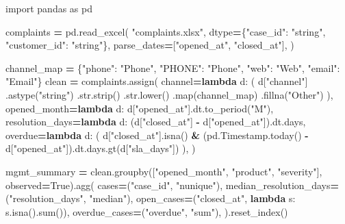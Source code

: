 \documentclass[
  12pt,
]{article}
\newenvironment{Shaded}{\begin{snugshade}}{\end{snugshade}}
\newcommand{\BuiltInTok}[1]{#1}
\newcommand{\ImportTok}[1]{#1}
\newcommand{\KeywordTok}[1]{\textcolor[rgb]{0.13,0.29,0.53}{\textbf{#1}}}
\newcommand{\NormalTok}[1]{#1}
\newcommand{\OperatorTok}[1]{\textcolor[rgb]{0.81,0.36,0.00}{\textbf{#1}}}
\newcommand{\StringTok}[1]{\textcolor[rgb]{0.31,0.60,0.02}{#1}}
\newcommand{\VariableTok}[1]{\textcolor[rgb]{0.00,0.00,0.00}{#1}}
\begin{document}
\begin{Shaded}
\begin{Highlighting}[]
\ImportTok{import}\NormalTok{ pandas }\ImportTok{as}\NormalTok{ pd}

\NormalTok{complaints }\OperatorTok{=}\NormalTok{ pd.read\_excel(}
    \StringTok{"complaints.xlsx"}\NormalTok{,}
\NormalTok{    dtype}\OperatorTok{=}\NormalTok{\{}\StringTok{"case\_id"}\NormalTok{: }\StringTok{"string"}\NormalTok{, }\StringTok{"customer\_id"}\NormalTok{: }\StringTok{"string"}\NormalTok{\},}
\NormalTok{    parse\_dates}\OperatorTok{=}\NormalTok{[}\StringTok{"opened\_at"}\NormalTok{, }\StringTok{"closed\_at"}\NormalTok{],}
\NormalTok{)}

\NormalTok{channel\_map }\OperatorTok{=}\NormalTok{ \{}\StringTok{"phone"}\NormalTok{: }\StringTok{"Phone"}\NormalTok{, }\StringTok{"PHONE"}\NormalTok{: }\StringTok{"Phone"}\NormalTok{, }\StringTok{"web"}\NormalTok{: }\StringTok{"Web"}\NormalTok{, }\StringTok{"email"}\NormalTok{: }\StringTok{"Email"}\NormalTok{\}}
\NormalTok{clean }\OperatorTok{=}\NormalTok{ complaints.assign(}
\NormalTok{    channel}\OperatorTok{=}\KeywordTok{lambda}\NormalTok{ d: (}
\NormalTok{        d[}\StringTok{"channel"}\NormalTok{]}
\NormalTok{        .astype(}\StringTok{"string"}\NormalTok{)}
\NormalTok{        .}\BuiltInTok{str}\NormalTok{.strip()}
\NormalTok{        .}\BuiltInTok{str}\NormalTok{.lower()}
\NormalTok{        .}\BuiltInTok{map}\NormalTok{(channel\_map)}
\NormalTok{        .fillna(}\StringTok{"Other"}\NormalTok{)}
\NormalTok{    ),}
\NormalTok{    opened\_month}\OperatorTok{=}\KeywordTok{lambda}\NormalTok{ d: d[}\StringTok{"opened\_at"}\NormalTok{].dt.to\_period(}\StringTok{"M"}\NormalTok{),}
\NormalTok{    resolution\_days}\OperatorTok{=}\KeywordTok{lambda}\NormalTok{ d: (d[}\StringTok{"closed\_at"}\NormalTok{] }\OperatorTok{{-}}\NormalTok{ d[}\StringTok{"opened\_at"}\NormalTok{]).dt.days,}
\NormalTok{    overdue}\OperatorTok{=}\KeywordTok{lambda}\NormalTok{ d: (}
\NormalTok{        d[}\StringTok{"closed\_at"}\NormalTok{].isna()}
        \OperatorTok{\&}\NormalTok{ (pd.Timestamp.today() }\OperatorTok{{-}}\NormalTok{ d[}\StringTok{"opened\_at"}\NormalTok{]).dt.days.gt(d[}\StringTok{"sla\_days"}\NormalTok{])}
\NormalTok{    ),}
\NormalTok{)}

\NormalTok{mgmt\_summary }\OperatorTok{=}\NormalTok{ clean.groupby([}\StringTok{"opened\_month"}\NormalTok{, }\StringTok{"product"}\NormalTok{, }\StringTok{"severity"}\NormalTok{], observed}\OperatorTok{=}\VariableTok{True}\NormalTok{).agg(}
\NormalTok{    cases}\OperatorTok{=}\NormalTok{(}\StringTok{"case\_id"}\NormalTok{, }\StringTok{"nunique"}\NormalTok{),}
\NormalTok{    median\_resolution\_days}\OperatorTok{=}\NormalTok{(}\StringTok{"resolution\_days"}\NormalTok{, }\StringTok{"median"}\NormalTok{),}
\NormalTok{    open\_cases}\OperatorTok{=}\NormalTok{(}\StringTok{"closed\_at"}\NormalTok{, }\KeywordTok{lambda}\NormalTok{ s: s.isna().}\BuiltInTok{sum}\NormalTok{()),}
\NormalTok{    overdue\_cases}\OperatorTok{=}\NormalTok{(}\StringTok{"overdue"}\NormalTok{, }\StringTok{"sum"}\NormalTok{),}
\NormalTok{).reset\_index()}


\end{Highlighting}
\end{Shaded}
\end{document}
